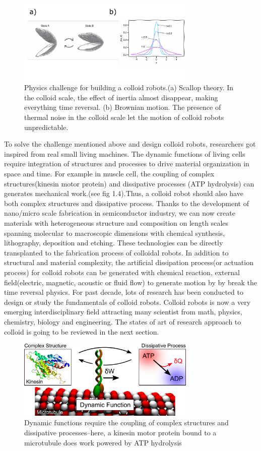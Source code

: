 \begin{figure}
\centering
\includegraphics[width=8.5cm]{figures/1_3.pdf}
\caption{Physics challenge for building a colloid robots.(a) Scallop theory. In the colloid scale, the effect of inertia almost disappear, making everything time reversal. (b) Brownian motion. The presence of thermal noise in the colloid scale let the motion of colloid robots unpredictable.}
\label{fig:1.3}
\end{figure}
To solve the  challenge mentioned above and design colloid robots, researchers got inspired from real small living  machines. The dynamic functions of living cells require integration of structures and processes to drive material organization in space and time. For example in muscle cell,  the coupling of complex structures(kinesin motor protein) and dissipative processes (ATP hydrolysis) can generates mechanical work.(see fig 1.4).Thus, a colloid robot should also have both complex structures and dissipative process. Thanks to the development of nano/micro scale fabrication in semiconductor industry, we can now create materials with heterogeneous structure and composition on length scales spanning molecular to macroscopic dimensions with chemical synthesis, lithography, deposition and etching. These technologies can be directly transplanted to the fabrication process of colloidal robots. In addition to structural and material complexity, the artificial dissipation process(or actuation process) for colloid robots  can be generated  with chemical reaction, external field(electric, magnetic, acoustic or fluid flow) to generate motion by by break the time reversal physics. For past decade, lots of research has been conducted to design or study the fundamentals of colloid robots. Colloid robots is now a very  emerging interdisciplinary field attracting many scientist from math, physics, chemistry, biology and engineering. The states of art of  research approach to colloid is going to be reviewed in the next section.
\begin{figure}
\centering
\includegraphics[width=8.5cm]{figures/1_4.png}
\caption{Dynamic functions require the coupling of complex structures and dissipative processes–here, a kinesin motor protein bound to a microtubule  does work powered by ATP hydrolysis}
\label{fig:1.4}
\end{figure}

